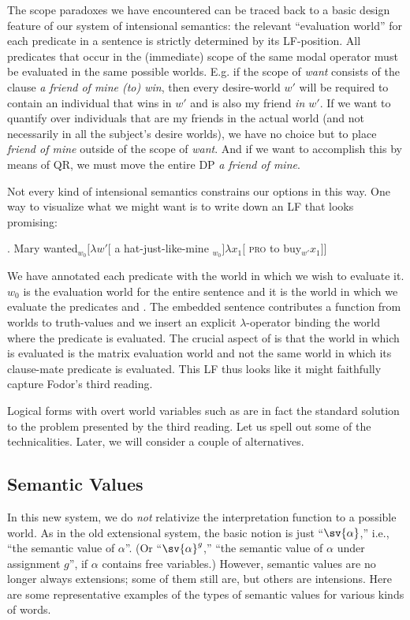The scope paradoxes we have encountered can be traced back to a basic design feature of our system of intensional semantics: the relevant ``evaluation world'' for each predicate in a sentence is strictly determined by its LF-position. All predicates that occur in the (immediate) scope of the same modal operator must be evaluated in the same possible worlds. E.g. if the scope of \emph{want} consists of the clause \emph{a friend of mine (to) win}, then every desire-world $w'$ will be required to contain an individual that wins in $w'$ and is also my friend \emph{in $w'$}. If we want to quantify over individuals that are my friends in the actual world (and not necessarily in all the subject's desire worlds), we have no choice but to place \emph{friend of mine} outside of the scope of \emph{want}. And if we want to accomplish this by means of QR, we must move the entire DP \emph{a friend of mine}.

Not every kind of intensional semantics constrains our options in this way. One way to visualize what we might want is to write down an LF that looks promising:

\ex. Mary wanted$_{w_0} [ \lambda w' [$ a hat-just-like-mine $_{w_0}] \lambda x_1 [$ \textsc{pro} to buy$_{w'} x_{1} ]]$

We have annotated each predicate with the world in which we wish to evaluate it. $w_0$ is the evaluation world for the entire sentence and it is the world in which we evaluate the predicates  and . The embedded sentence contributes a function from worlds to truth-values and we insert an explicit $\lambda$-operator binding the world where the predicate  is evaluated. The crucial aspect of \Last is that the world in which  is evaluated is the matrix evaluation world and not the same world in which its clause-mate predicate  is evaluated. This LF thus looks like it might faithfully capture Fodor's third reading.

Logical forms with overt world variables such as \Last are in fact the standard solution to the problem presented by the third reading. Let us spell out some of the technicalities. Later, we will consider a couple of alternatives.

\subsection{Semantic Values}

In this new system, we do \emph{not} relativize the interpretation function to a possible world. As in the old extensional system, the basic notion is just ``$\sv{\alpha}$,'' i.e., ``the semantic value of $\alpha$''. (Or ``$\sv{\alpha}^g$,'' ``the semantic value of $\alpha$ under assignment $g$'', if $\alpha$ contains free variables.) However, semantic values are no longer always extensions; some of them still are, but others are intensions. Here are some representative examples of the types of semantic values for various kinds of words.

